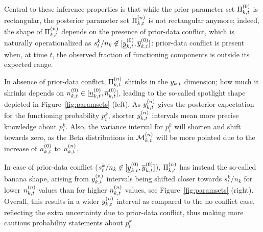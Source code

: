 \documentclass[12pt, a4paper]{elsarticle}
\begin{document}
Central to these inference properties is that
while the prior parameter set $\Pi^{(0)}_{k,t}$ is rectangular,
the posterior parameter set $\Pi^{(n)}_{k,t}$ is not rectangular anymore;
indeed, the shape of $\Pi^{(n)}_{k,t}$ depends on the presence of prior-data conflict,
which is naturally operationalized as $s^k_t/n_k \not\in [\underline{y}^{(0)}_{k,t}, \overline{y}^{(0)}_{k,t}]$:
prior-data conflict is present when, at time $t$, the observed fraction of functioning components
is outside its expected range.

In absence of prior-data conflict, 
$\Pi^{(n)}_{k,t}$ shrinks in the $y_{k,t}$ dimension;
how much it shrinks depends on $n^{(0)}_{k,t} \in [\underline{n}^{(0)}_{k,t}, \overline{n}^{(0)}_{k,t}]$,
leading to the so-called spotlight shape depicted in Figure~\ref{fig:paramsets} (left).
As $y^{(n)}_{k,t}$ gives the posterior expectation for the functioning probability $p_t^k$,
shorter $y^{(n)}_{k,t}$ intervals mean more precise knowledge about $p_t^k$.
Also, the variance interval for $p_t^k$ will shorten and shift towards zero,
as the Beta distributions in $\mathcal{M}^{(n)}_{k,t}$ will be more pointed
due to the increase of $n^{(0)}_{k,t}$ to $n^{(n)}_{k,t}$.

In case of prior-data conflict ($s^k_t/n_k \not\in [\underline{y}^{(0)}_{k,t}, \overline{y}^{(0)}_{k,t}]$),
$\Pi^{(n)}_{k,t}$ has instead the so-called banana shape,
arising from $y^{(n)}_{k,t}$ intervals being shifted closer towards $s^k_t/n_k$
for lower $n^{(n)}_{k,t}$ values than for higher $n^{(n)}_{k,t}$ values, see Figure~\ref{fig:paramsets} (right).
Overall, this results in a wider $y^{(n)}_{k,t}$ interval as compared to the no conflict case, 
reflecting the extra uncertainty due to prior-data conflict,
thus making more cautious probability statements about $p_t^k$.
\end{document}
